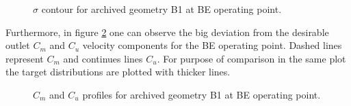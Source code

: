 \begin{figure}[h!]
\begin{minipage}[b]{1\linewidth}
 \centering
\end{minipage}
\caption{$\sigma$ contour for archived geometry B1 at BE operating point.}
\label{Francis-B1-BE}
\end{figure}

Furthermore, in figure \ref{Francis-B1-OUT} one can observe the big deviation from the desirable outlet $C_m$ and $C_u$ velocity components for the BE operating point.  Dashed lines represent $C_m$ and continues lines $C_u$. For purpose of comparison in the same plot the target distributions are plotted with thicker lines.   

\begin{figure}[h!]
\begin{minipage}[b]{1\linewidth}
 \centering
\end{minipage}
\caption{$C_m$ and $C_u$ profiles for archived geometry B1 at BE operating point.}
\label{Francis-B1-OUT}
\end{figure}

